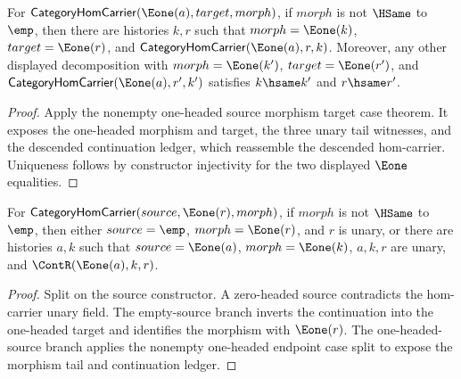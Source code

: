 \begin{theorem}
\label{thm:category-e1-source-nonempty-morphism-target-carrier-unique}
For $\mathsf{CategoryHomCarrier}(\Eone(a),target,morph)$, if $morph$ is not
$\HSame$ to $\emp$, then there are histories $k,r$ such that
$morph=\Eone(k)$, $target=\Eone(r)$, and
$\mathsf{CategoryHomCarrier}(\Eone(a),r,k)$. Moreover, any other displayed
decomposition with $morph=\Eone(k')$, $target=\Eone(r')$, and
$\mathsf{CategoryHomCarrier}(\Eone(a),r',k')$ satisfies
$k\hsame k'$ and $r\hsame r'$.
\end{theorem}
\begin{proof}
Apply the nonempty one-headed source morphism target case theorem. It exposes
the one-headed morphism and target, the three unary tail witnesses, and the
descended continuation ledger, which reassemble the descended hom-carrier.
Uniqueness follows by constructor injectivity for the two displayed
$\Eone$ equalities.
\end{proof}

\begin{theorem}
\label{thm:category-hom-carrier-e1-target-nonempty-morphism-source-cases}
For $\mathsf{CategoryHomCarrier}(source,\Eone(r),morph)$, if $morph$ is not
$\HSame$ to $\emp$, then either $source=\emp$, $morph=\Eone(r)$, and $r$ is
unary, or there are histories $a,k$ such that $source=\Eone(a)$,
$morph=\Eone(k)$, $a,k,r$ are unary, and $\ContR(\Eone(a),k,r)$.
\end{theorem}
\begin{proof}
Split on the source constructor. A zero-headed source contradicts the
hom-carrier unary field. The empty-source branch inverts the continuation into
the one-headed target and identifies the morphism with $\Eone(r)$. The
one-headed-source branch applies the nonempty one-headed endpoint case split to
expose the morphism tail and continuation ledger.
\end{proof}

